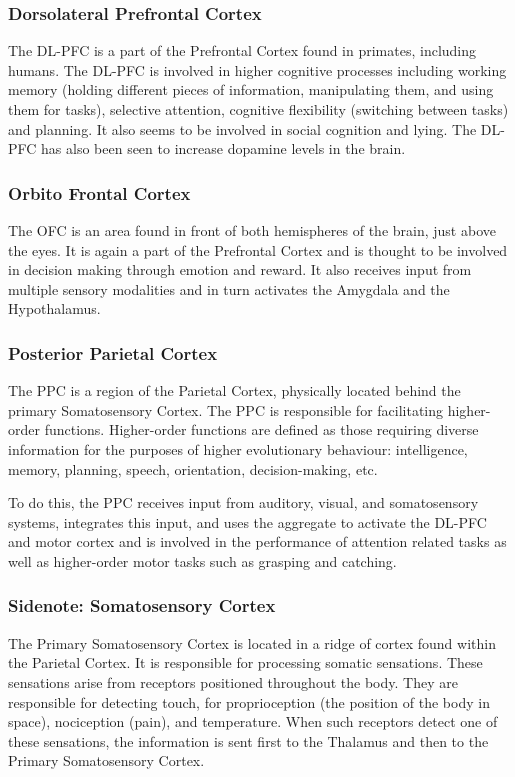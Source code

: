 \documentclass[a4paper, amsfonts, amssymb, amsmath, reprint, showkeys, nofootinbib, twoside]{revtex4-1}
\begin{document}
\subsubsection{Dorsolateral Prefrontal Cortex}

The DL-PFC is a part of the Prefrontal Cortex found in primates, including
humans. The DL-PFC is involved in higher cognitive processes including working memory
(holding different pieces of information, manipulating them, and using them for
tasks), selective attention, cognitive flexibility (switching between tasks) and
planning. It also seems to be involved in social cognition and lying. The DL-PFC has
also been seen to increase dopamine levels in the brain. \cite{dlpfcmemory,dlpfctasks,dlpfclying}

\subsubsection{Orbito Frontal Cortex}

The OFC is an area found in front of both hemispheres of the brain, just above the
eyes. It is again a part of the Prefrontal Cortex and is thought to be involved in
decision making through emotion and reward. It also receives input from multiple
sensory modalities and in turn activates the Amygdala and the
Hypothalamus. \cite{theprefrontalcortex,ofcprimates,theorbitofrontalcortex}

\subsubsection{Posterior Parietal Cortex}
The PPC is a region of the Parietal Cortex, physically located behind the primary
Somatosensory Cortex. The PPC is responsible for facilitating higher-order
functions. Higher-order functions are defined as those requiring diverse information
for the purposes of higher evolutionary behaviour: intelligence, memory, planning,
speech, orientation, decision-making, etc.

To do this, the PPC receives input from auditory, visual, and somatosensory
systems, integrates this input, and uses the aggregate to activate the DL-PFC and motor cortex and is
involved in the performance of attention related tasks as well as higher-order motor
tasks such as grasping and catching. \cite{parietallobesa}

\subsubsection{Sidenote: Somatosensory Cortex}
The Primary Somatosensory Cortex is located in a ridge of cortex found within the Parietal Cortex.
It is responsible for processing somatic sensations. These sensations arise from receptors
positioned throughout the body. They are responsible for detecting touch, for proprioception
(the position of the body in space), nociception (pain), and temperature. \cite{somato}
When such receptors detect one of these sensations, the information is sent first to
the Thalamus and then to the Primary Somatosensory Cortex.
\end{document}
